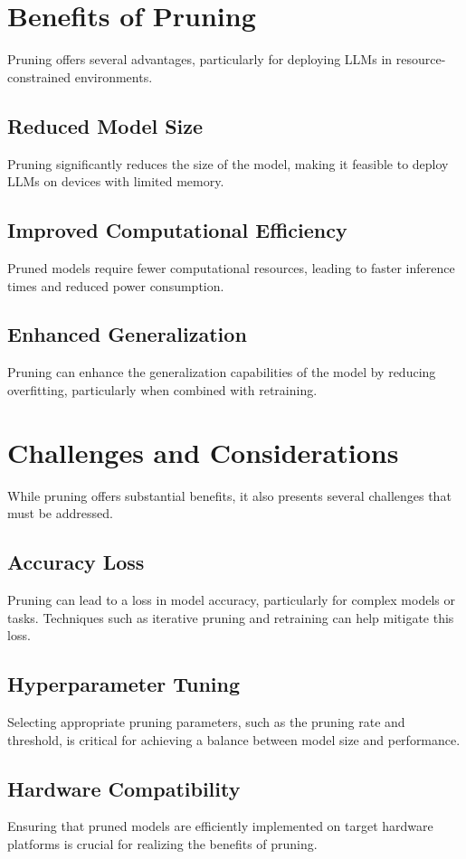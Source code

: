 \section{Benefits of Pruning}
Pruning offers several advantages, particularly for deploying LLMs in resource-constrained environments.

\subsection{Reduced Model Size}
Pruning significantly reduces the size of the model, making it feasible to deploy LLMs on devices with limited memory.

\subsection{Improved Computational Efficiency}
Pruned models require fewer computational resources, leading to faster inference times and reduced power consumption.

\subsection{Enhanced Generalization}
Pruning can enhance the generalization capabilities of the model by reducing overfitting, particularly when combined with retraining.

\section{Challenges and Considerations}
While pruning offers substantial benefits, it also presents several challenges that must be addressed.

\subsection{Accuracy Loss}
Pruning can lead to a loss in model accuracy, particularly for complex models or tasks. Techniques such as iterative pruning and retraining can help mitigate this loss.

\subsection{Hyperparameter Tuning}
Selecting appropriate pruning parameters, such as the pruning rate and threshold, is critical for achieving a balance between model size and performance.

\subsection{Hardware Compatibility}
Ensuring that pruned models are efficiently implemented on target hardware platforms is crucial for realizing the benefits of pruning.

